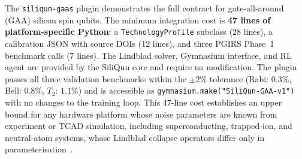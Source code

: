 The \texttt{siliqun-gaas} plugin demonstrates the full contract for
gate-all-around (GAA) silicon spin qubits. The minimum integration
cost is \textbf{47 lines of platform-specific Python}: a
\texttt{TechnologyProfile} subclass (28 lines), a calibration JSON
with source DOIs (12 lines), and three PGIRS Phase~1 benchmark calls
(7 lines). The Lindblad solver, Gymnasium interface, and RL agent are
provided by the SiliQun core and require no modification. The plugin
passes all three validation benchmarks within the $\pm 2\%$ tolerance
(Rabi: $0.3\%$, Bell: $0.8\%$, $T_2$: $1.1\%$) and is accessible as
\texttt{gymnasium.make("SiliQun-GAA-v1")} with no changes to the
training loop. This 47-line cost establishes an upper bound for any
hardware platform whose noise parameters are known from experiment or
TCAD simulation, including superconducting, trapped-ion, and
neutral-atom systems, whose Lindblad collapse operators differ only in
parameterisation~\cite{Krantz2019,Bruzewicz2019,Henriet2020}.

\begin{table}[tp]
  \centering
  \caption{Minimum plugin contract cost (LOC = lines of code).
    The GAA column reflects the minimum contract: \texttt{gaa\_profile.py}
    + \texttt{gaa\_calibration.json} + \texttt{gaa\_benchmarks.py} = 47~lines.
    The physics-faithful reference implementation totals $\approx$980~lines
    and ships separately. Superconducting and trapped-ion columns are
    projections based on noise model complexity.}
  \label{tab:plugin_cost}
\end{table}

